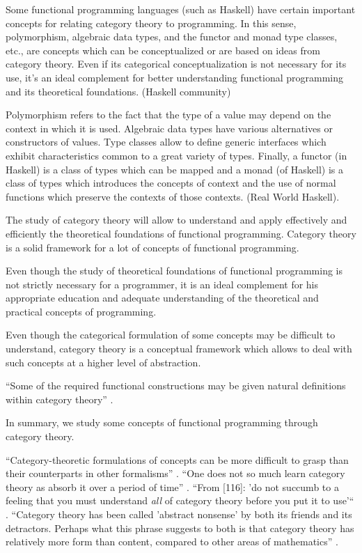 Some functional programming languages (such as Haskell) have certain
important concepts for relating category theory to programming. In
this sense, polymorphism, algebraic data types, and the functor and
monad type classes, etc., are concepts which can be conceptualized or
are based on ideas from category theory. Even if its categorical
conceptualization is not necessary for its use, it's an ideal
complement for better understanding functional programming and its
theoretical foundations. (Haskell community)

Polymorphism refers to the fact that the type of a value may depend on
the context in which it is used. Algebraic data types have various
alternatives or constructors of values. Type classes allow to define
generic interfaces which exhibit characteristics common to a great
variety of types. Finally, a functor (in Haskell) is a class of types
which can be mapped and a monad (of Haskell) is a class of types which
introduces the concepts of context and the use of normal functions
which preserve the contexts of those contexts. (Real World Haskell).

The study of category theory will allow to understand and apply
effectively and efficiently the theoretical foundations of functional
programming. Category theory is a solid framework for a lot of
concepts of functional programming.

Even though the study of theoretical foundations of functional
programming is not strictly necessary for a programmer, it is an ideal
complement for his appropriate education and adequate understanding of
the theoretical and practical concepts of programming.

Even though the categorical formulation of some concepts may be
difficult to understand, category theory is a conceptual framework
which allows to deal with such concepts at a higher level of
abstraction.

``Some of the required functional constructions may be given natural
definitions within category theory'' \parencite[7]{pitt-1986}.






In summary, we study some concepts of functional programming through
category theory.






``Category-theoretic formulations of concepts can be more difficult to
grasp than their counterparts in other formalisms''
\parencite[xi]{pierce-1991}. ``One does not so much learn category
theory as absorb it over a period of time''
\parencite[25]{bird-demoor-1997}. ``From [116]: 'do not succumb to a
feeling that you must understand \emph{all} of category theory before
you put it to use'`` \parencite[xi]{pierce-1991}. ``Category theory
has been called 'abstract nonsense' by both its friends and its
detractors. Perhaps what this phrase suggests to both is that category
theory has relatively more form than content, compared to other areas
of mathematics'' \parencite[50]{goguen-1991}.

